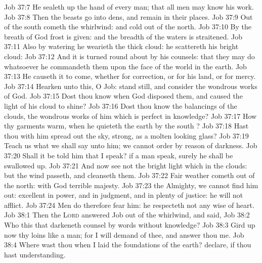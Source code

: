 \vs Job 37:7 He sealeth up the hand of every man; that all men may know his work.
\vs Job 37:8 Then the beasts go into dens, and remain in their places.
\vs Job 37:9 Out of the south cometh the whirlwind: and cold out of the north.
\vs Job 37:10 By the breath of God frost is given: and the breadth of the waters is straitened.
\vs Job 37:11 Also by watering he wearieth the thick cloud: he scattereth his bright cloud:
\vs Job 37:12 And it is turned round about by his counsels: that they may do whatsoever he commandeth them upon the face of the world in the earth.
\vs Job 37:13 He causeth it to come, whether for correction, or for his land, or for mercy.
\vs Job 37:14 Hearken unto this, O Job: stand still, and consider the wondrous works of God.
\vs Job 37:15 Dost thou know when God disposed them, and caused the light of his cloud to shine?
\vs Job 37:16 Dost thou know the balancings of the clouds, the wondrous works of him which is perfect in knowledge?
\vs Job 37:17 How thy garments  warm, when he quieteth the earth by the south ?
\vs Job 37:18 Hast thou with him spread out the sky,  strong,  as a molten looking glass?
\vs Job 37:19 Teach us what we shall say unto him;  we cannot order  by reason of darkness.
\vs Job 37:20 Shall it be told him that I speak? if a man speak, surely he shall be swallowed up.
\vs Job 37:21 And now  see not the bright light which  in the clouds: but the wind passeth, and cleanseth them.
\vs Job 37:22 Fair weather cometh out of the north: with God  terrible majesty.
\vs Job 37:23  the Almighty, we cannot find him out:  excellent in power, and in judgment, and in plenty of justice: he will not afflict.
\vs Job 37:24 Men do therefore fear him: he respecteth not any  wise of heart.
\vs Job 38:1 Then the \textsc{Lord} answered Job out of the whirlwind, and said,
\vs Job 38:2 Who  this that darkeneth counsel by words without knowledge?
\vs Job 38:3 Gird up now thy loins like a man; for I will demand of thee, and answer thou me.
\vs Job 38:4 Where wast thou when I laid the foundations of the earth? declare, if thou hast understanding.
